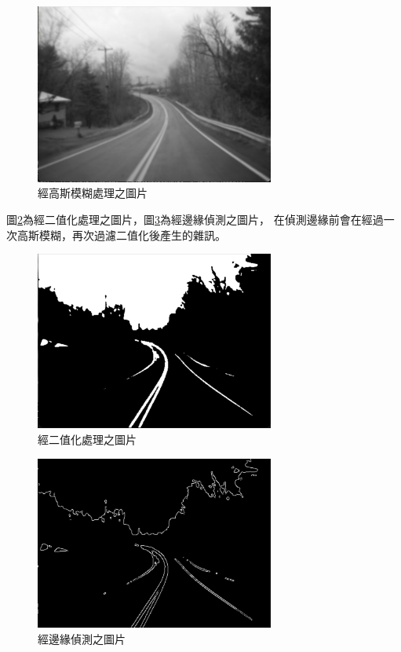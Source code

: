 \documentclass[12pt]{article}       %
\begin{document}
\begin{figure}[H]
    \centering
    \includegraphics[width=0.7\textwidth]{39.jpg}     %
    \caption{經高斯模糊處理之圖片}    %
    \label{fig:39}    %
\end{figure}

圖\ref{fig:40}為經二值化處理之圖片，圖\ref{fig:41}為經邊緣偵測之圖片，
在偵測邊緣前會在經過一次高斯模糊，再次過濾二值化後產生的雜訊。

\begin{figure}[H]
    \centering
    \includegraphics[width=0.7\textwidth]{40.jpg}     %
    \caption{經二值化處理之圖片}    %
    \label{fig:40}    %
\end{figure}

\begin{figure}[H]
    \centering
    \includegraphics[width=0.7\textwidth]{41.jpg}     %
    \caption{經邊緣偵測之圖片}    %
    \label{fig:41}    %
\end{figure}
\end{document}
